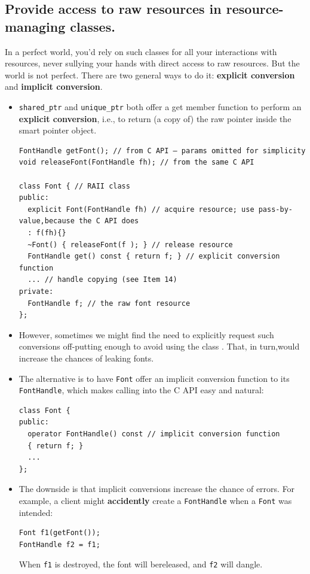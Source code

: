 \subsection{Provide access to raw resources in resource-managing classes. }
\label{sec:Item-15}

In a perfect world, you'd rely on such classes for all your
interactions with resources, never sullying your hands with direct
access to raw resources. But the world is not perfect. There are two
general ways to do it: \textbf{explicit conversion } and
\textbf{implicit conversion}.

\begin{itemize}
\item \texttt{shared\_ptr} and \texttt{unique\_ptr} both offer a get
  member function to perform an \textbf{explicit conversion}, i.e., to return
  (a copy of) the raw pointer inside the smart pointer object.
\begin{verbatim}
FontHandle getFont(); // from C API — params omitted for simplicity
void releaseFont(FontHandle fh); // from the same C API

class Font { // RAII class
public:
  explicit Font(FontHandle fh) // acquire resource; use pass-by-value,because the C API does
  : f(fh){}
  ~Font() { releaseFont(f ); } // release resource
  FontHandle get() const { return f; } // explicit conversion function
  ... // handle copying (see Item 14)
private:
  FontHandle f; // the raw font resource
};
\end{verbatim}
\item However, sometimes we might find the need to explicitly request
  such conversions off-putting enough to avoid using the class . That,
  in turn,would increase the chances of leaking fonts.
\item The alternative is to have \texttt{Font} offer an implicit conversion
  function to its \texttt{FontHandle}, which  makes calling into the C
  API easy and natural:
\begin{verbatim}
class Font {
public:
  operator FontHandle() const // implicit conversion function
  { return f; }
  ...
};
\end{verbatim}
\item The downside is that implicit conversions increase the chance of
errors. For example, a client might \textbf{accidently} create a
\texttt{FontHandle} when a \texttt{Font} was intended:
\begin{verbatim}
Font f1(getFont());
FontHandle f2 = f1;
\end{verbatim}
When \texttt{f1} is destroyed, the font will bereleased, and
\texttt{f2} will dangle.
\end{itemize}

